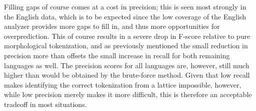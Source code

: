Filling gaps of course comes at a cost in precision; this is seen most strongly in the English data, which is to be expected since the low coverage of the English analyzer provides more gaps to fill in, and thus more opportunities for overprediction. This of course results in a severe drop in F-score relative to pure morphological tokenization, and as previously mentioned the small reduction in precision more than offsets the small increase in recall for both remaining languages as well. The precision scores for all languages are, however, still much higher than would be obtained by the brute-force method. Given that low recall makes identifying the correct tokenization from a lattice impossible, however, while low precision merely makes it more difficult, this is therefore an acceptable tradeoff in most situations.